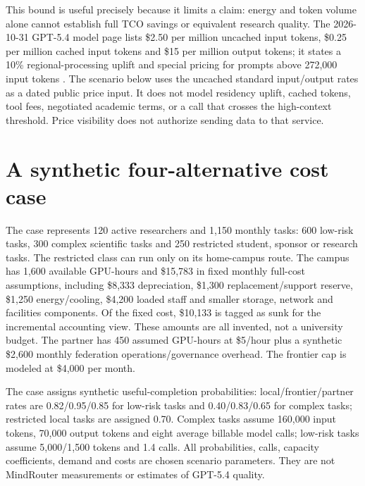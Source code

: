 This bound is useful precisely because it limits a claim: energy and token volume alone cannot establish full TCO savings or equivalent research quality. The 2026-10-31 GPT-5.4 model page lists \$2.50 per million uncached input tokens, \$0.25 per million cached input tokens and \$15 per million output tokens; it states a 10\% regional-processing uplift and special pricing for prompts above 272,000 input tokens \cite{gpt54}. The scenario below uses the uncached standard input/output rates as a dated public price input. It does not model residency uplift, cached tokens, tool fees, negotiated academic terms, or a call that crosses the high-context threshold. Price visibility does not authorize sending data to that service.

\section{A synthetic four-alternative cost case}
The case represents 120 active researchers and 1,150 monthly tasks: 600 low-risk tasks, 300 complex scientific tasks and 250 restricted student, sponsor or research tasks. The restricted class can run only on its home-campus route. The campus has 1,600 available GPU-hours and \$15,783 in fixed monthly full-cost assumptions, including \$8,333 depreciation, \$1,300 replacement/support reserve, \$1,250 energy/cooling, \$4,200 loaded staff and smaller storage, network and facilities components. Of the fixed cost, \$10,133 is tagged as sunk for the incremental accounting view. These amounts are all invented, not a university budget. The partner has 450 assumed GPU-hours at \$5/hour plus a synthetic \$2,600 monthly federation operations/governance overhead. The frontier cap is modeled at \$4,000 per month.

The case assigns synthetic useful-completion probabilities: local/frontier/partner rates are 0.82/0.95/0.85 for low-risk tasks and 0.40/0.83/0.65 for complex tasks; restricted local tasks are assigned 0.70. Complex tasks assume 160,000 input tokens, 70,000 output tokens and eight average billable model calls; low-risk tasks assume 5,000/1,500 tokens and 1.4 calls. All probabilities, calls, capacity coefficients, demand and costs are chosen scenario parameters. They are not MindRouter measurements or estimates of GPT-5.4 quality.

